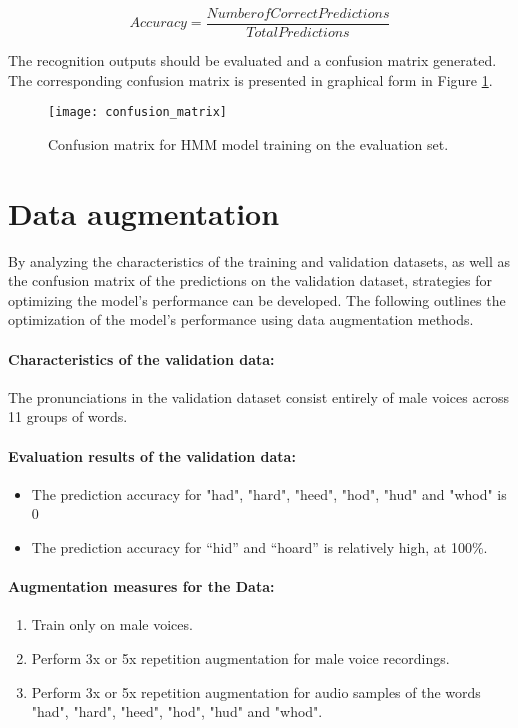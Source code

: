 \documentclass{article}
\begin{document}
\begin{equation}
	Accuracy = \frac{Number of Correct Predictions}{Total Predictions}
\end{equation}

The recognition outputs should be evaluated and a confusion matrix generated. The corresponding confusion matrix is presented in graphical form in Figure \ref{fig:confusion-matrix}.

\begin{figure}[!h]
\begin{center}
\texttt{[image: confusion\_matrix]}
\end{center}
\caption{\label{fig:confusion-matrix} Confusion matrix for HMM model training on the evaluation set.}
\end{figure}

\section{Data augmentation}

By analyzing the characteristics of the training and validation datasets, as well as the confusion matrix of the predictions on the validation dataset, strategies for optimizing the model’s performance can be developed. The following outlines the optimization of the model’s performance using data augmentation methods.

\paragraph{Characteristics of the validation data:}
The pronunciations in the validation dataset consist entirely of male voices across 11 groups of words.

\paragraph{Evaluation results of the validation data:}
\begin{itemize}
\item The prediction accuracy for "had", "hard", "heed", "hod", "hud" and "whod" is 0%
\item The prediction accuracy for “hid” and “hoard” is relatively high, at 100\%.	
\end{itemize}

\paragraph{Augmentation measures for the Data:}
\begin{enumerate}
\item Train only on male voices.
\item Perform 3x or 5x repetition augmentation for male voice recordings.
\item Perform 3x or 5x repetition augmentation for audio samples of the words "had", "hard", "heed", "hod", "hud" and "whod".
\end{enumerate}
\end{document}
